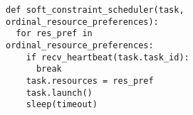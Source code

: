 
\begin{figure}[t]
\centering



\begin{subfigure}[b]{0.45\linewidth}
  \centering
  \begin{subfigure}{\textwidth}
\begin{verbatim}
def soft_constraint_scheduler(task, ordinal_resource_preferences):
  for res_pref in ordinal_resource_preferences:
    if recv_heartbeat(task.task_id):
      break
    task.resources = res_pref
    task.launch()
    sleep(timeout)


\end{verbatim}
\end{subfigure}
\end{subfigure}
\end{figure}
